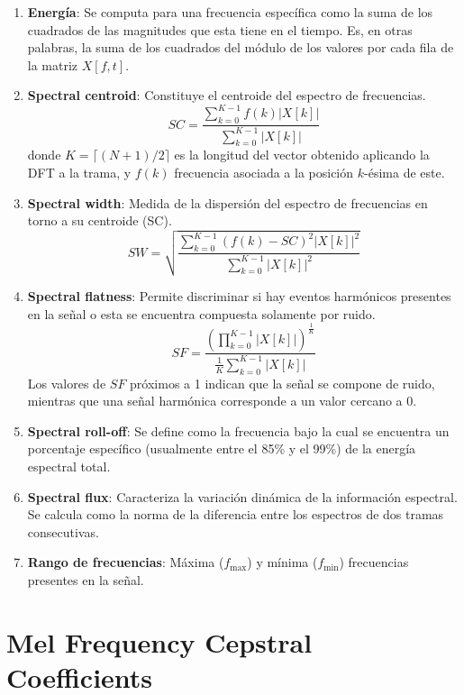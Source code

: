 \begin{enumerate}
    \item \textbf{Energía}: Se computa para una frecuencia específica como la suma de los cuadrados de las magnitudes que esta tiene en el tiempo.
    Es, en otras palabras, la suma de los cuadrados del módulo de los valores por cada fila de la matriz $X[f,t]$.
    \item \textbf{Spectral centroid}: Constituye el centroide del espectro de frecuencias.
    \[
        SC = \frac{\sum_{k=0}^{K-1}{f(k)|X[k]|}}{\sum_{k=0}^{K-1}{|X[k]|}}
    \]
    donde $K = \lceil (N+1)/2 \rceil$ es la longitud del vector obtenido aplicando la DFT a la trama, y $f(k)$ frecuencia asociada a la posición $k$-ésima de este.
    \item \textbf{Spectral width}: Medida de la dispersión del espectro de frecuencias en torno a su centroide (SC).
    \[
        SW = \sqrt{\frac{\sum_{k=0}^{K-1}{(f(k)-SC)^2 |X[k]|^2}}{\sum_{k=0}^{K-1}{|X[k]|^2}}}
    \]
    \item \textbf{Spectral flatness}: Permite discriminar si hay eventos harmónicos presentes en la señal o esta se encuentra compuesta solamente por ruido.
    \[
        SF = \frac{(\prod_{k=0}^{K-1}{|X[k]|})^{\frac{1}{K}}}{\frac{1}{K}\sum_{k=0}^{K-1}{|X[k]|}}
    \]
    Los valores de $SF$ próximos a 1 indican que la señal se compone de ruido, mientras que una señal harmónica corresponde a un valor cercano a 0.
    \item \textbf{Spectral roll-off}: Se define como la frecuencia bajo la cual se encuentra un porcentaje específico (usualmente entre el 85\% y el 99\%) de la energía espectral total.
    \item \textbf{Spectral flux}: Caracteriza la variación dinámica de la información espectral.
    Se calcula como la norma de la diferencia entre los espectros de dos tramas consecutivas.
    \item \textbf{Rango de frecuencias}: Máxima ($f_{\max}$) y mínima ($f_{\min}$) frecuencias presentes en la señal.
\end{enumerate}

\section{Mel Frequency Cepstral Coefficients}\label{sec:melFrequencyCepstralCoefficients}

